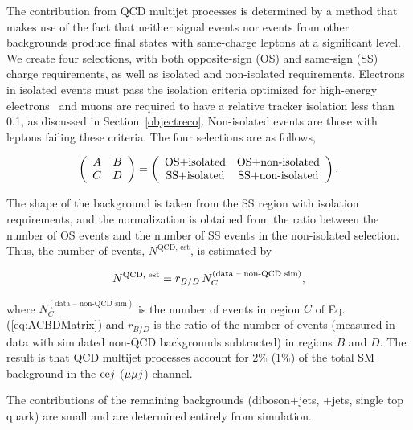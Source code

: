 The contribution from QCD multijet processes is determined by a method that makes use of the fact that neither signal events nor events from other backgrounds produce final states with same-charge leptons at a significant level.  We create four selections, with both opposite-sign (OS) and same-sign (SS) charge requirements, as well as isolated and non-isolated requirements.  Electrons in isolated events must pass the isolation criteria optimized for high-energy electrons~\cite{CMS-PAPERS-EXO-12-061} and muons are required to have a relative tracker isolation less than 0.1, as discussed in Section~\ref{objectreco}.  Non-isolated events are those with leptons failing these criteria.  The four selections are as follows,

\begin{equation}
\sloppy
\left( \begin{array}{cc}
  A & B  \\
  C & D  
\end{array} \right) = 
\left( \begin{array}{cc}
  \text{OS+isolated} & \text{OS+non-isolated}  \\
  \text{SS+isolated} & \text{SS+non-isolated}  
\end{array} \right).
\label{eq:ACBDMatrix}
\end{equation}

The shape of the background is taken from the SS region with isolation requirements, and the normalization is obtained from the ratio between the number of OS events and the number of SS events in the non-isolated selection.  Thus, the number of events, $N^{\text{QCD, est}}$, is estimated by 

\begin{equation}
\small{
N^{\text{QCD, est}} = r_{B/D} \, N_{C}^{(\text{data -- non-QCD sim})}
},
\label{eq:QCD_ABCDeq}
\end{equation}

where $N_{C}^{(\text{data -- non-QCD sim})}$ is the number of events in region $C$ of Eq. (\ref{eq:ACBDMatrix}) and $r_{B/D}$ is the ratio of the number of events (measured in data with simulated non-QCD backgrounds subtracted) in regions $B$ and $D$.  The result is that QCD multijet processes account for 2\% (1\%) of the total SM background in the $\mathrm{e} \mathrm{e} j$ (${\mu} {\mu} j$) channel.

The contributions of the remaining backgrounds (diboson+jets, \PW+jets, single top quark) are small and are determined entirely from simulation.

